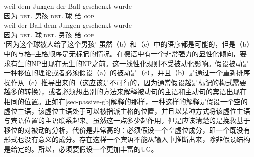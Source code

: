 \ex 
\gll weil dem Jungen der Ball geschenkt wurde\\
     因为 \textsc{det}.\dat{} 男孩 \textsc{det}.\nom{} 球 给 \textsc{cop}\\
\ex 
\gll weil der Ball dem Jungen geschenkt wurde\\
     因为 \textsc{det}.\nom{} 球 \textsc{det}.\dat{} 男孩 给 \textsc{cop}\\
\glt `因为这个球被人给了这个男孩'
\zl
虽然（b）和（c）中的语序都是可能的，但是（b）中的与格--主格顺序是无标记的情况。在德语中有一个非常强力的显性化倾向，要求有生的NP出现在无生的NP之前\citep[]{Hoberg81a}。这一线性化规则不受被动化影响。假设被动是一种移位的理论或者必须假设（a）的被动是（c），并且（b）是通过一个重新排序操作从（c）推导出来的（这应该是不可行的，因为通常假设越是标记的构式需要越多的转换），或者必须想出别的方法来解释被动句的主语和主动句的宾语出现在相同的位置。正如在\ref{sec-passive-gb}解释的那样，一种这样的解释是假设一个空的虚位主语，该虚位主语处于可以被指派主格的位置，并且以某种方式将该虚位主语与宾语位置的主语联系起来。虽然这一点多少起作用，但是应该清楚的是挽救基于移位的对被动的分析，代价是非常高的：必须假设一个空虚位成分，即一个既没有形式也没有意义的成分。存在这样一个宾语不能从输入中推断出来，除非假设结构是给定的。所以，必须要假设一个更加丰富的UG\indexugc。
